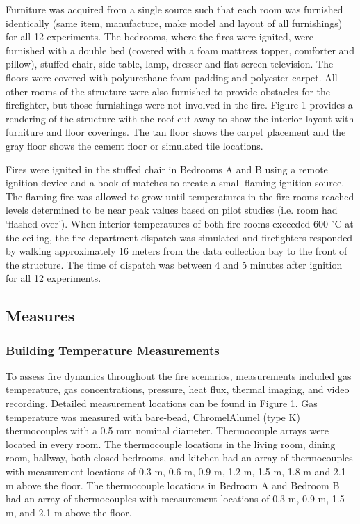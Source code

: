 \documentclass[12pt,oneside]{article}
\begin{document}
Furniture was acquired from a single source such that each room was furnished identically (same item, manufacture, make model and layout of all furnishings) for all 12 experiments. The bedrooms, where the fires were ignited, were furnished with a double bed (covered with a foam mattress topper, comforter and pillow), stuffed chair, side table, lamp, dresser and flat screen television.  The floors were covered with polyurethane foam padding and polyester carpet.  All other rooms of the structure were also furnished to provide obstacles for the firefighter, but those furnishings were not involved in the fire. Figure 1 provides a rendering of the structure with the roof cut away to show the interior layout with furniture and floor coverings.  The tan floor shows the carpet placement and the gray floor shows the cement floor or simulated tile locations.  

Fires were ignited in the stuffed chair in Bedrooms  A and B using a remote ignition device and a book of matches to create a small flaming ignition source.  The flaming fire was allowed to grow until temperatures in the fire rooms reached levels determined to be near peak values based on pilot studies (i.e. room had `flashed over').  When interior temperatures of both fire rooms exceeded 600 $^{\circ}$C at the ceiling, the fire department dispatch was simulated and firefighters responded by walking approximately 16 meters from the data collection bay to the front of the structure.  The time of dispatch was between 4 and 5 minutes after ignition for all 12 experiments.  

\subsection{Measures}

\subsubsection{Building Temperature Measurements}
To assess fire dynamics throughout the fire scenarios, measurements included gas temperature, gas concentrations, pressure, heat flux, thermal imaging, and video recording. Detailed measurement locations can be found in Figure 1.  
Gas temperature was measured with bare-bead, ChromelAlumel (type K) thermocouples with a 0.5 mm nominal diameter. Thermocouple arrays were located in every room. The thermocouple locations in the living room, dining room, hallway, both closed bedrooms, and kitchen had an array of thermocouples with measurement locations of 0.3 m, 0.6 m, 0.9 m, 1.2 m, 1.5 m, 1.8 m and 2.1 m above the floor. The thermocouple locations in Bedroom A and Bedroom B had an array of thermocouples with measurement locations of 0.3 m, 0.9 m, 1.5 m, and 2.1 m above the floor. 
\end{document}
